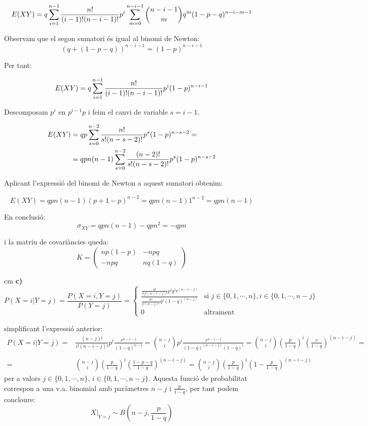 \documentclass{article}
\begin{document}
\[
E(XY)= q \sum_{i=1}^{n-1} {n! \over (i-1)! (n-i-1)!} p^i \sum_{m=0}^{n-i-1} \binom{n-i-1}{m} q^m  (1-p-q)^{n-i-m-1}
\]

Observam que el segon sumatori \'es igual al binomi de Newton: \[ (q + (1-p-q) )^{n-i-1} = (1-p)^{n-i-1} \]

Per tant:

\[
E(XY)= q \sum_{i=1}^{n-1} {n! \over (i-1)! (n-i-1)!} p^i (1-p)^{n-i-1}
\]

Descomposam $p^i$ en $p^{i-1} p$ i feim el canvi de variable $s=i-1$. 

\[
\begin{split}
E(XY)& = qp \sum_{s=0}^{n-2} {n! \over s! (n-s-2)!} p^s (1-p)^{n-s-2} = \\
&= qp n (n-1) \sum_{s=0}^{n-2} {(n-2)! \over s! (n-s-2)!} p^s (1-p)^{n-s-2}
\end{split}
\]

Aplicant l'expressi\'o del binomi de Newton a aquest sumatori obtenim:

\[
E(XY)=qp n (n-1) (p+1-p)^{n-2}=qpn(n-1) 1^{n-2}=qpn(n-1)
\]


En conclusi\'o: $$\sigma_{XY}=qpn(n-1)-qpn^2=-qpn$$

i la matriu de covari\`ancies queda:
\[
K=\begin{pmatrix} np(1-p) & -npq \\ -npq & nq(1-q) \end{pmatrix}
\]


 cm
\noindent
\textbf{c)}
\[
P(X=i | Y=j)=\frac{ P(X=i, Y=j) }{P(Y=j)} = 
\begin{cases}
\frac{ \frac{n!}{i! j! (n-i-j)!} p^i q^j r^{(n-i-j)} }{ \frac{n!}{j! (n-j)!} q^j (1-q)^{(n-j)}} & 
\text{si } j \in \{ 0, 1, \cdots, n \}, i \in \{ 0, 1, \cdots, n-j\} \\
0 & \text{altrament}
\end{cases}
\] 

\noindent
simplificant l'expressi\'o anterior:
\[
\begin{array}{rl}
P(X=i | Y=j)=&\frac{(n-j)!}{i! (n-i-j)!} p^i \frac{r^{n-i-j}}{(1-q)^{n-j}}=
\binom{n-j}{i} p^i \frac{r^{n-i-j}}{(1-q)^{(n-i-j)} (1-q)^i}=
\binom{n-j}{i} \left( \frac{p}{1-q} \right)^i \left( \frac{r}{1-q} \right)^{(n-i-j)}= \\ \\
=& \binom{n-j}{i} \left( \frac{p}{1-q} \right)^i \left( \frac{1-p-q}{1-q} \right)^{(n-i-j)}=
\binom{n-j}{i} \left( \frac{p}{1-q} \right)^i \left( 1 - \frac{p}{1-q} \right)^{(n-i-j)}
\end{array}
\]
\noindent
per a valors $j \in \{ 0, 1, \cdots, n \}$, $i \in \{ 0, 1, \cdots, n-j\}$. 
Aquesta funci\'o de probabilitat correspon a una v.a. binomial amb par\`ametres
$n-j$ i $\frac{p}{1-q}$, per tant podem concloure:
\[
X|_{Y=j} \sim B(n-j, \frac{p}{1-q})
\]
\end{document}

